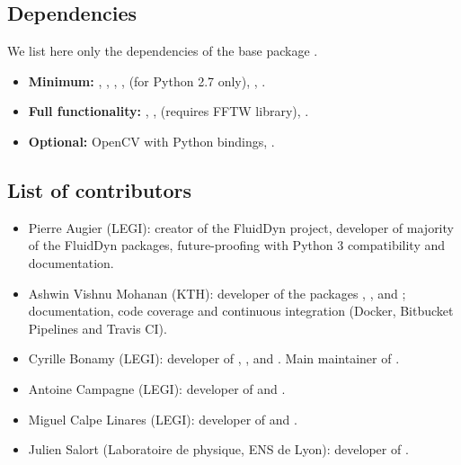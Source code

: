 

\subsection{Dependencies}


We list here only the dependencies of the base package .

\begin{itemize}
\item {\bf Minimum:} \Numpy, , , ,
 (for Python 2.7 only), , .

\item {\bf Full functionality:} , , 
(requires FFTW library), .

\item {\bf Optional:} OpenCV with Python bindings, .
\end{itemize}
\subsection{List of contributors}


\begin{itemize}
\item Pierre Augier (LEGI): creator of the FluidDyn project, developer of
majority of the FluidDyn packages, future-proofing with Python 3 compatibility
and documentation.

\item Ashwin Vishnu Mohanan (KTH): developer of the packages
, ,  and
\fluiddyn; documentation, code coverage and continuous integration (Docker,
Bitbucket Pipelines and Travis CI).

\item Cyrille Bonamy (LEGI): developer of , ,
 and . Main maintainer of .

\item Antoine Campagne (LEGI): developer of  and
.

\item Miguel Calpe Linares (LEGI): developer of  and
.

\item Julien Salort (Laboratoire de physique, ENS de Lyon): developer of
.

\end{itemize}

